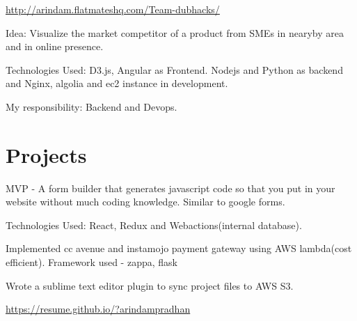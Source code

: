 \documentclass[]{deedy-resume-openfont}
\begin{document}
\begin{minipage}[t]{0.66\textwidth}
{ \url{http://arindam.flatmateshq.com/Team-dubhacks/} }\\
\begin{tightemize}
\item Idea: Visualize the market competitor of a product from SMEs in nearyby area and in online presence.
\item Technologies Used: D3.js, Angular as Frontend. Nodejs and Python as backend and Nginx, algolia and ec2 instance in development.
\item My responsibility: Backend and Devops.
\vspace{\topsep} %
\end{tightemize}

\section{Projects}


\begin{tightemize}
\item MVP - A form builder that generates javascript code so that you put in your website without much coding knowledge. Similar to google forms.
\item Technologies Used: React, Redux and Webactions(internal database).
\vspace{\topsep} %
\end{tightemize}

\begin{tightemize}
\item Implemented cc avenue and instamojo payment gateway using AWS lambda(cost efficient). Framework used - zappa, flask
\item Wrote a sublime text editor plugin to sync project files to AWS S3.
\vspace{\topsep} %
\end{tightemize}

{ \url{https://resume.github.io/?arindampradhan } }\\


\end{minipage}
\end{document}
